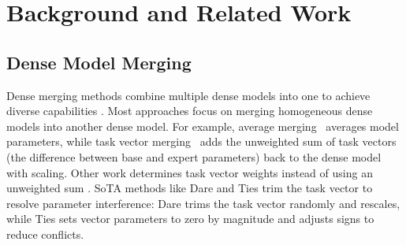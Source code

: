 \section{Background and Related Work}

\subsection{Dense Model Merging}


Dense merging methods combine multiple dense models into one to achieve diverse capabilities \cite{wortsman2022model, ilharco2022editing, goddard2024arcee, jin2022dataless, matena2022merging, roberts2024pretrained}. Most approaches focus on merging homogeneous dense models into another dense model. For example, average merging~\cite{wortsman2022model} averages model parameters, while task vector merging~\cite{ilharco2022editing} adds the unweighted sum of task vectors (the difference between base and expert parameters) back to the dense model with scaling. Other work determines task vector weights instead of using an unweighted sum \cite{jin2022dataless, matena2022merging}. SoTA methods like Dare and Ties \cite{yadav2024ties, yu2024language} trim the task vector to resolve parameter interference: Dare trims the task vector randomly and rescales, while Ties sets vector parameters to zero by magnitude and adjusts signs to reduce conflicts.


